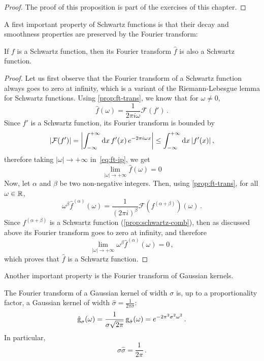 \begin{proof}
  The proof of this proposition is part of the exercises of this chapter.
\end{proof}
A first important property of Schwartz functions is that their decay and smoothness
properties are preserved by the Fourier transform:
\begin{theorem}
  If $f$ is a Schwartz function, then its Fourier transform $\hat{f}$ is also a Schwartz
  function.
\end{theorem}
\begin{proof}
  Let us first observe that the Fourier transform of a Schwartz function always goes to
  zero at infinity, which is a variant of the Riemann-Lebesgue lemma for Schwartz
  functions. Using \cref{prop:ft-trans}, we know that for $\omega\neq 0$,
  \begin{equation}
    \hat{f}(\omega)=\frac{1}{2\pi i\omega}\mathcal{F}(f')\,.\label{eq:ft-ip}
  \end{equation}
  Since $f'$ is a Schwartz function, its Fourier transform is bounded by
  \begin{equation}
    |\mathcal{F}(f')|=\left|\int_{-\infty}^{+\infty}\mathrm{d}{x}\,f'(x)\,e^{-2\pi i \omega x}\right|\leq
    \int_{-\infty}^{+\infty}\mathrm{d}{x}\,|f'(x)|\,,
  \end{equation}
  therefore taking $|\omega|\to+\infty$ in~\cref{eq:ft-ip}, we get
  \begin{equation}
    \lim_{|\omega|\to+\infty}\hat{f}(\omega)=0
  \end{equation}
  Now, let $\alpha$ and $\beta$ be two non-negative integers. Then, using
  \cref{prop:ft-trans}, for all $\omega\in\mathbb{R}$,
  \begin{equation}
    \omega^\beta\hat{f}^{(\alpha)}(\omega)
    =\frac{1}{(2\pi i)^{\beta}}\mathcal{F}(f^{(\alpha+\beta)})(\omega)\,.
  \end{equation}
  Since $f^{(\alpha+\beta)}$ is a Schwartz function (\cref{prop:schwartz-comb}), then as
  discussed above its Fourier transform goes to zero at infinity, and therefore
  \begin{equation}
    \lim_{|\omega|\to+\infty}\omega^\beta\hat{f}^{(\alpha)}(\omega)=0\,,
  \end{equation}
  which proves that $\hat{f}$ is a Schwartz function.
\end{proof}
Another important property is the Fourier transform of Gaussian kernels.
\begin{theorem}
  \label{thm:gauss-uncertainty}
  The Fourier transform of a Gaussian kernel of width $\sigma$ is, up to a proportionality
  factor, a Gaussian kernel of width $\hat{\sigma}=\frac{1}{2\pi\sigma}$:
  \begin{equation}
    \hat{\operatorname{g}}_{\sigma}(\omega)=
    \frac{1}{\sigma\sqrt{2\pi}}\operatorname{g}_{\hat{\sigma}}(\omega)
    =e^{-2\pi^2\sigma^2\omega^2}\,.
  \end{equation}
  In particular,
  \begin{equation}
    \sigma\hat{\sigma}=\frac{1}{2\pi}\,.\label{eq:gauss-uncertainty}
  \end{equation}
\end{theorem}
